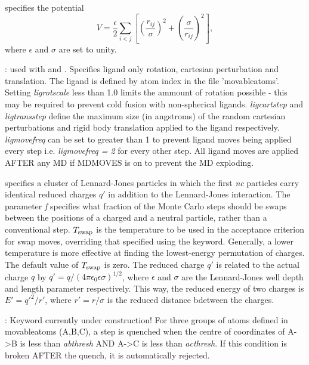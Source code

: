  specifies the potential\cite{LB299a,LB299b,LB204}
\begin{equation}
V = \frac{\epsilon}{2} \sum_{i<j} \left[ \left(\frac{r_{ij}}{\sigma}\right)^2+
\left(\frac{\sigma}{r_{ij}}\right)^2 \right],
\end{equation}
where $\epsilon$ and $\sigma$ are set to unity.

: used with {\/} and {}. Specifies ligand only rotation, cartesian perturbation and translation. The ligand is defined by atom index in the file 'movableatoms'. Setting {\it ligrotscale} less than 1.0
limits the ammount of rotation possible - this may be required to prevent cold fusion with non-spherical ligands. {\it ligcartstep} and {\it ligtransstep} 
define the maximum size (in angstroms) of the random cartesian perturbations and rigid body translation applied to the ligand respectively. 
{\it ligmovefreq} can be set to greater than 1 to prevent ligand moves being applied every step i.e. {\it ligmovefreq = 2} for every other step.
All ligand moves are applied AFTER any MD if {MDMOVES} is on to prevent the MD exploding.    

 specifies a cluster of Lennard-Jones particles in which the first {\it nc}
particles carry identical reduced charges {\it $q'$} in addition to the Lennard-Jones interaction.
The parameter {\it f} specifies what fraction of the Monte Carlo steps should be swaps between the
positions of a charged and a neutral particle, rather than a conventional step.
$T_{\rm swap}$ is the temperature to be used in the acceptance criterion for swap moves, overriding
that specified using the {} keyword.  Generally, a lower temperature is more effective
at finding the lowest-energy permutation of charges.  The default value of $T_{\rm swap}$ is zero.
The reduced charge $q'$ is related to the actual charge $q$ by $q'=q/(4\pi\epsilon_0\epsilon\sigma)^{1/2}$,
where $\epsilon$ and $\sigma$ are the Lennard-Jones well depth and length parameter respectively.
This way, the reduced energy of two charges is $E'=q'^2/r'$, where $r'=r/\sigma$ is the reduced distance
bdetween the charges.

: Keyword currently under construction! For three groups of atoms defined in movableatoms
(A,B,C), a step is quenched when the centre of coordinates of A->B is less than {\it abthresh} AND A->C is less than {\it acthresh}. 
If this condition is broken AFTER the quench, it is automatically rejected.

